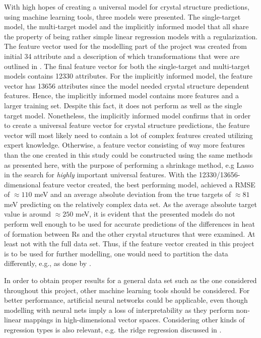 With high hopes of creating a universal model for crystal structure predictions, using machine learning tools, three models were presented. The single-target model, the multi-target model and the implicitly informed model that all share the property of being rather simple linear regression models with a  regularization. The feature vector used for the modelling part of the project was created from initial 34 attribute and a description of which transformations that were are outlined in . The final feature vector for both the single-target and multi-target models contains 12330 attributes. For the implicitly informed model, the feature vector has 13656 attributes since the model needed crystal structure dependent features. Hence, the implicitly informed model contains more features and a larger training set. Despite this fact, it does not perform as well as the single target model. Nonetheless, the implicitly informed model confirms that in order to create a universal feature vector for crystal structure predictions, the feature vector will most likely need to contain a lot of complex features created utilizing expert knowledge. Otherwise, a feature vector consisting of way more features than the one created in this study could be constructed using the same methods as presented here, with the purpose of performing a shrinkage method, e.g Lasso in the search for \emph{highly} important universal features. With the 12330/13656-dimensional feature vector created, the best performing model, achieved a RMSE of $\approx 110$ meV and an average absolute deviation from the true targets of $\approx 81$ meV predicting on the relatively complex data set. As the average absolute target value is around $\approx 250$ meV, it is evident that the presented models do not perform well enough to be used for accurate predictions of the differences in heat of formation between Rs and the other crystal structures that were examined. At least not with the full data set. Thus, if the feature vector created in this project is to be used for further modelling, one would need to partition the data differently, e.g., as done by \citep{criticalrole_descriptor}. 
 
 In order to obtain proper results for a general data set such as the one considered throughout this project, other machine learning tools should be considered. For better performance, artificial neural networks could be applicable, even though modelling with neural nets imply a loss of interpretability as they perform non-linear mappings in high-dimensional vector spaces. Considering other kinds of regression types is also relevant, e.g. the ridge regression discussed in .  
 

